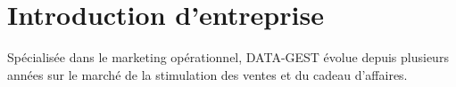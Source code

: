 \section{Introduction d'entreprise}
\justifying

Spécialisée dans le marketing opérationnel, DATA-GEST évolue depuis plusieurs années sur le marché de la stimulation des ventes et du cadeau d’affaires.\\[2ex]



